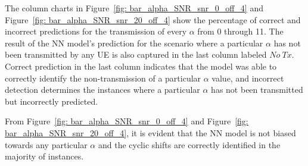 \documentclass[journal]{IEEEtran}
\begin{document}
The column charts in Figure~\ref{fig: bar_alpha_SNR_snr_0_off_4} and Figure~\ref{fig: bar_alpha_SNR_snr_20_off_4} show the percentage of correct and incorrect predictions for the transmission of every $\alpha$ from 0 through 11. The result of the NN model's prediction for the scenario where a particular $\alpha$ has not been transmitted by any UE is also captured in the last column labeled $No\ Tx$. Correct prediction in the last column indicates that the model was able to correctly identify the non-transmission of a particular $\alpha$ value, and incorrect detection determines the instances where a particular $\alpha$ has not been transmitted but incorrectly predicted. 

From Figure~\ref{fig: bar_alpha_SNR_snr_0_off_4} and Figure~\ref{fig: bar_alpha_SNR_snr_20_off_4}, it is evident that the NN model is not biased towards any particular $\alpha$ and the cyclic shifts are correctly identified in the majority of instances.

\end{document}
